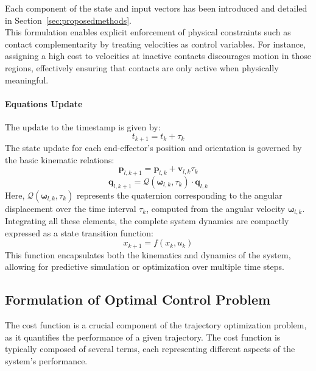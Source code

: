 \documentclass[main.tex]{subfiles}
\begin{document}
\vspace{0.3cm} 

Each component of the state and input vectors has been introduced and detailed in Section~\ref{sec:proposedmethods}.
\\ 
This formulation enables explicit enforcement of physical constraints such as contact complementarity by treating velocities as control variables. For instance, assigning a high cost to velocities at inactive contacts discourages motion in those regions, effectively ensuring that contacts are only active when physically meaningful.
\paragraph{Equations Update}
The update to the timestamp is given by:
\begin{equation}
    t_{k+1} = t_k + \tau_k
\end{equation}
The state update for each end-effector’s position and orientation is governed by the basic kinematic relations:
\begin{equation}
    \mathbf{p}_{l,k+1} = \mathbf{p}_{l,k} + \mathbf{v}_{l,k} \tau_k
\end{equation}
\begin{equation}
    \mathbf{q}_{l,k+1} = \mathcal{Q}(\boldsymbol{\omega}_{l,k}, \tau_k) \cdot \mathbf{q}_{l,k}
\end{equation}
Here, $\mathcal{Q}(\boldsymbol{\omega}_{l,k}, \tau_k)$ represents the quaternion corresponding to the angular displacement over the time interval $\tau_k$, computed from the angular velocity $\boldsymbol{\omega}_{l,k}$.
Integrating all these elements, the complete system dynamics are compactly expressed as a state transition function:
\begin{equation}
    x_{k+1} = f(x_k, u_k)
\end{equation}
This function encapsulates both the kinematics and dynamics of the system, allowing for predictive simulation or optimization over multiple time steps.
\subsection{Formulation of Optimal Control Problem}
The cost function is a crucial component of the trajectory optimization problem, as it quantifies the performance of a given trajectory. The cost function is typically composed of several terms, each representing different aspects of the system's performance.
\end{document}

